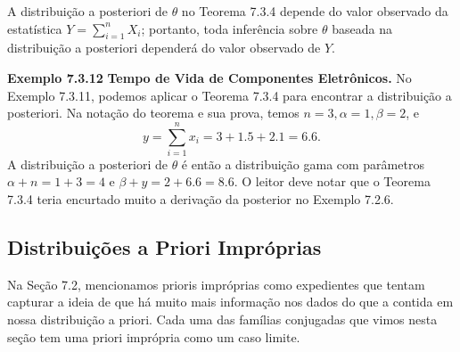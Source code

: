 \vspace{1cm}
A distribuição a posteriori de $\theta$ no Teorema 7.3.4 depende do valor observado da estatística $Y = \sum_{i=1}^{n}X_i$; portanto, toda inferência sobre $\theta$ baseada na distribuição a posteriori dependerá do valor observado de $Y$.

\vspace{1cm}
\noindent\textbf{Exemplo 7.3.12} \quad \textbf{Tempo de Vida de Componentes Eletrônicos.} No Exemplo 7.3.11, podemos aplicar o Teorema 7.3.4 para encontrar a distribuição a posteriori. Na notação do teorema e sua prova, temos $n=3, \alpha=1, \beta=2$, e
$$ y = \sum_{i=1}^{n}x_i = 3+1.5+2.1=6.6. $$
A distribuição a posteriori de $\theta$ é então a distribuição gama com parâmetros $\alpha+n=1+3=4$ e $\beta+y=2+6.6=8.6$.
O leitor deve notar que o Teorema 7.3.4 teria encurtado muito a derivação da posterior no Exemplo 7.2.6.

\subsection*{Distribuições a Priori Impróprias}
Na Seção 7.2, mencionamos prioris impróprias como expedientes que tentam capturar a ideia de que há muito mais informação nos dados do que a contida em nossa distribuição a priori. Cada uma das famílias conjugadas que vimos nesta seção tem uma priori imprópria como um caso limite.


